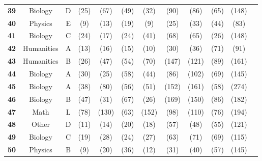 \begin{table*}[htb]
\begin{center}
\begin{tiny}
\begin{tabular}{l|c|c|ccccccccc}
\textbf{39} & Biology & D  & \X [B] (25) & \X [B] (67) & \X [B] (49) & \X [B] (32) & \X [B] (90) & \X [B] (86) & \X [B] (65) & \X [B] (148)\\
\textbf{40} & Physics &  E  & \X [C] (9) & \X [C] (13) & \X [C] (19) & \X [C] (9) & \X [C] (25) & \X [C] (33) & \X [error] (44) & \X [tanh] (83)\\
\textbf{41} & Biology & C  & \X [D] (24) & \C [C] (17) & \C [C] (24) & \C [C] (41) & \C [C] (68) & \X [D] (65) & \X [error] (26) & \X [B] (148)\\
\textbf{42} & Humanities & A  & \X [C] (13) & \X [C] (16) & \X [C] (15) & \X [C] (10) & \X [C] (30) & \X [C] (36) & \X [C] (71) & \X [C] (91)\\
\textbf{43} & Humanities & B  & \C [B] (26) & \C [B] (47) & \X [C] (54) & \X [C] (70) & \X [D] (147) & \X [D] (121) & \X [C] (89) & \X [C] (161)\\
\textbf{44} & Biology & A  & \C [A] (30) & \X [B] (25) & \X [error] (58) & \C [A] (44) & \C [A] (86) & \C [A] (102) & \C [A] (69) & \X [A] (145)\\
\textbf{45} & Biology & A  & \X [B] (38) & \X [B] (80) & \X [B] (56) & \X [B] (51) & \X [B] (152) & \X [B] (161) & \X [error] (58) & \C [A] (274)\\
\textbf{46} & Biology & B  & \X [C] (47) & \X [C] (31) & \X [C] (67) & \X [C] (26) & \X [C] (169) & \X [C] (150) & \X [error] (86) & \X [None] (182)\\
\textbf{47} & Math & L  & \C [L] (78) & \C [L] (130) & \X [python] (63) & \C [L] (152) & \X [J] (98) & \C [L] (110) & \X [J] (76) & \X [J] (194)\\
\textbf{48} & Other &  D  & \C [D] (11) & \C [D] (14) & \C [D] (20) & \C [D] (18) & \C [D] (57) & \C [D] (48) & \C [D] (55) & \X [B] (121)\\
\textbf{49} & Biology & C  & \X [B] (19) & \X [B] (28) & \X [B] (24) & \X [B] (27) & \X [B] (63) & \X [B] (71) & \X [B] (69) & \X [E] (115)\\
\textbf{50} & Physics & B  & \X [C] (9) & \X [C] (20) & \X [C] (36) & \X [C] (12) & \X [C] (31) & \X [C] (40) & \X [C] (57) & \X [None] (145)\\
\bottomrule
\end{tabular}
\end{tiny}
\end{center}
\vspace{-10pt}
\end{table*}



